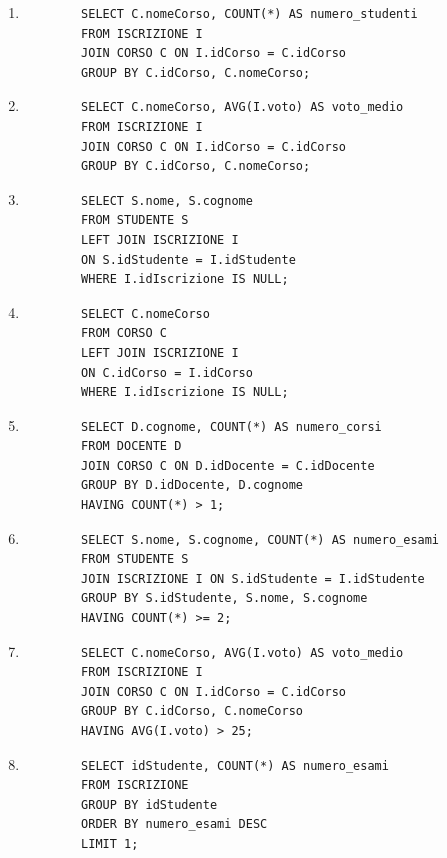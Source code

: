 \documentclass[a4paper,12pt]{article}
\begin{document}
\begin{enumerate}
	\item
	\begin{verbatim}
		SELECT C.nomeCorso, COUNT(*) AS numero_studenti
		FROM ISCRIZIONE I
		JOIN CORSO C ON I.idCorso = C.idCorso
		GROUP BY C.idCorso, C.nomeCorso;
	\end{verbatim}
	
	\item
	\begin{verbatim}
		SELECT C.nomeCorso, AVG(I.voto) AS voto_medio
		FROM ISCRIZIONE I
		JOIN CORSO C ON I.idCorso = C.idCorso
		GROUP BY C.idCorso, C.nomeCorso;
	\end{verbatim}
	
	\item
	\begin{verbatim}
		SELECT S.nome, S.cognome
		FROM STUDENTE S
		LEFT JOIN ISCRIZIONE I
		ON S.idStudente = I.idStudente
		WHERE I.idIscrizione IS NULL;
	\end{verbatim}
	
	\item
	\begin{verbatim}
		SELECT C.nomeCorso
		FROM CORSO C
		LEFT JOIN ISCRIZIONE I
		ON C.idCorso = I.idCorso
		WHERE I.idIscrizione IS NULL;
	\end{verbatim}
	
	\item
	\begin{verbatim}
		SELECT D.cognome, COUNT(*) AS numero_corsi
		FROM DOCENTE D
		JOIN CORSO C ON D.idDocente = C.idDocente
		GROUP BY D.idDocente, D.cognome
		HAVING COUNT(*) > 1;
	\end{verbatim}
	
	\item
	\begin{verbatim}
		SELECT S.nome, S.cognome, COUNT(*) AS numero_esami
		FROM STUDENTE S
		JOIN ISCRIZIONE I ON S.idStudente = I.idStudente
		GROUP BY S.idStudente, S.nome, S.cognome
		HAVING COUNT(*) >= 2;
	\end{verbatim}
	
	\item
	\begin{verbatim}
		SELECT C.nomeCorso, AVG(I.voto) AS voto_medio
		FROM ISCRIZIONE I
		JOIN CORSO C ON I.idCorso = C.idCorso
		GROUP BY C.idCorso, C.nomeCorso
		HAVING AVG(I.voto) > 25;
	\end{verbatim}
	
	\item
	\begin{verbatim}
		SELECT idStudente, COUNT(*) AS numero_esami
		FROM ISCRIZIONE
		GROUP BY idStudente
		ORDER BY numero_esami DESC
		LIMIT 1;
	\end{verbatim}
	

\end{enumerate}
\end{document}
